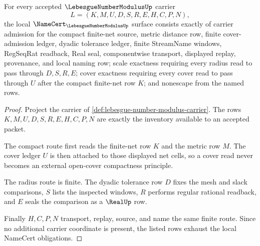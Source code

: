 \begin{theorem}
\label{thm:lebesgue-number-modulus-namecert-obligations}
For every accepted $\LebesgueNumberModulusUp$ carrier
$$
L=(K,M,U,D,S,R,E,H,C,P,N),
$$
the local $\NameCert_{\LebesgueNumberModulusUp}$ surface consists exactly of carrier admission for the compact finite-net source, metric distance row, finite cover-admission ledger, dyadic tolerance ledger, finite StreamName windows, RegSeqRat readback, Real seal, componentwise transport, displayed replay, provenance, and local naming row; scale exactness requiring every radius read to pass through $D,S,R,E$; cover exactness requiring every cover read to pass through $U$ after the compact finite-net row $K$; and nonescape from the named rows.
\end{theorem}
\begin{proof}
Project the carrier of \autoref{def:lebesgue-number-modulus-carrier}. The rows $K,M,U,D,S,R,E,H,C,P,N$ are exactly the inventory available to an accepted packet.

The compact route first reads the finite-net row $K$ and the metric row $M$. The cover ledger $U$ is then attached to those displayed net cells, so a cover read never becomes an external open-cover compactness principle.

The radius route is finite. The dyadic tolerance row $D$ fixes the mesh and slack comparisons, $S$ lists the inspected windows, $R$ performs regular rational readback, and $E$ seals the comparison as a $\RealUp$ row.

Finally $H,C,P,N$ transport, replay, source, and name the same finite route. Since no additional carrier coordinate is present, the listed rows exhaust the local NameCert obligations.
\end{proof}

